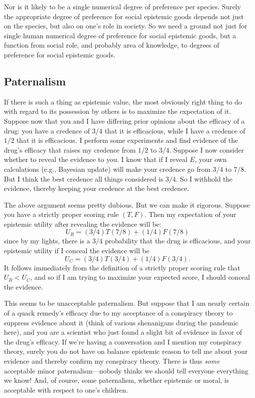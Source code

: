 Nor is it likely to be a single numerical degree of preference per species. Surely the appropriate degree of preference for social epistemic 
goods depends not just on the species, but also on one's role in society. So we need a ground not just for single human numerical degree of
preference for social epistemic goods, but a function from social role, and probably area of knowledge, to degrees of preference for
social epistemic goods.

\subsection{Paternalism}
If there is such a thing as epistemic value, the most obviously right thing to do with regard to its possession
by others is to maximize the expectation of it. Suppose now that you and I have differing prior opinions about the efficacy
of a drug: you have a credence of $3/4$ that it is efficacious, while I have a credence of $1/2$ that it is efficacious.
I perform some experiments and find evidence of the drug's efficacy that raises my credence from $1/2$ to $3/4$.
Suppose I now consider whether to reveal the evidence to you. I know that if I reveal $E$, your own calculations
(e.g., Bayesian update) will make your credence go from $3/4$ to $7/8$. But I think the best credence all things considered is $3/4$.
So I withhold the evidence, thereby keeping your credence at the best credence. 

The above argument seems pretty dubious. But we can make it rigorous. Suppose you have a strictly proper 
scoring rule $(T,F)$. Then
my expectation of your epistemic utility after revealing the evidence will be:
$$
	U_R = (3/4)T(7/8)+(1/4)F(7/8)
$$
since by my lights, there is a $3/4$ probability that the drug is efficacious, and your epistemic utility if I
conceal the evidence will be
$$
	U_C = (3/4)T(3/4)+(1/4)F(3/4).
$$
It follows immediately from the definition of a strictly proper scoring rule that $U_R < U_C$, and so if I am trying
to maximize your expected score, I should conceal the evidence.

This seems to be unacceptable paternalism. But suppose that I am nearly certain of a quack remedy's
efficacy due to my acceptance of a conspiracy theory to suppress evidence about it (think of various
shenanigans during the pandemic here), and you are a scientist who just found a slight bit of evidence 
in favor of the drug's efficacy. If we're having a conversation and I mention my conspiracy theory, surely
you do not have on balance epistemic reason to tell me about your evidence and thereby confirm my conspiracy
theory. There is thus \textit{some} acceptable minor paternalism---nobody thinks we should tell everyone everything
we know! And, of course, some paternalism, whether epistemic or moral, is acceptable with respect to one's children.

